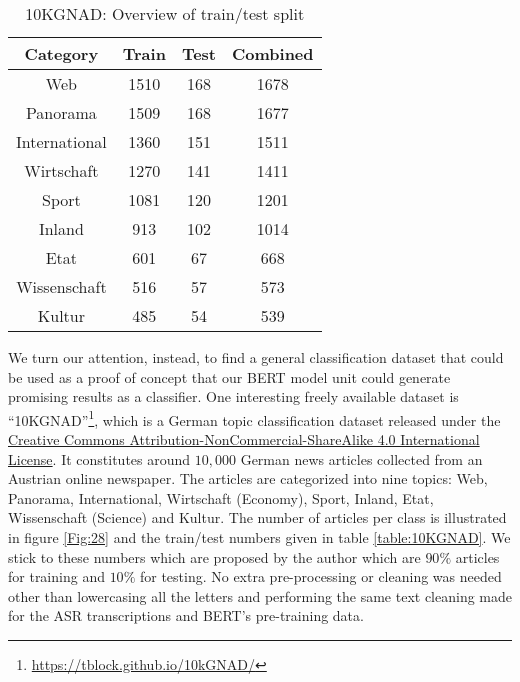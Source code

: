 \begin{table}[!ht]
	\centering
	\begin{tabular}{|c|c|c|c|}
		\hline
		Category		& Train	& Test  & Combined  \\ \hline
		Web				& 1510 	& 168	& 1678 		\\ \hline
		Panorama 		& 1509 	& 168	& 1677		\\ \hline
		International 	& 1360	& 151	& 1511		\\ \hline
		Wirtschaft 		& 1270	& 141	& 1411		\\ \hline
		Sport 			& 1081	& 120	& 1201		\\ \hline
		Inland 			& 913	& 102	& 1014		\\ \hline
		Etat 			& 601	& 67	& 668		\\ \hline
		Wissenschaft 	& 516	& 57	& 573		\\ \hline
		Kultur 			& 485	& 54	& 539		\\ \hline
		
	\end{tabular}
	\caption{10KGNAD: Overview of train/test split}
	\label{meth:table5}
\end{table}



We turn our attention, instead, to find a general classification dataset that could be used as a proof of concept that our \ac{BERT} model unit could generate promising results as a classifier. One interesting freely available dataset is \enquote{\ac{10KGNAD}}\footnote{\url{https://tblock.github.io/10kGNAD/}}, which is a German topic classification dataset released under the \href{https://creativecommons.org/licenses/by-nc-sa/4.0/}{Creative Commons Attribution-NonCommercial-ShareAlike 4.0 International License}. It constitutes around $10,000$ German news articles collected from an Austrian online newspaper. The articles are categorized into nine topics: Web, Panorama, International, Wirtschaft (Economy), Sport, Inland, Etat, Wissenschaft (Science) and Kultur. The number of articles per class is illustrated in figure \ref{Fig:28} and the train/test numbers given in table \ref{table:10KGNAD}. We stick to these numbers which are proposed by the author which are $90\%$ articles for training and $10\%$ for testing. No extra pre-processing or cleaning was needed other than lowercasing all the letters and performing the same text cleaning made for the \ac{ASR} transcriptions and \ac{BERT}'s pre-training data.


